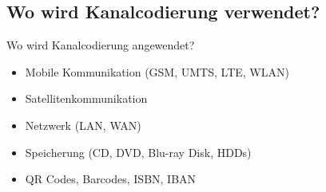 \documentclass[ngerman]{beamer}
\begin{document}
%
%


\subsection{Wo wird Kanalcodierung verwendet?}
\begin{frame}{Wo wird Kanalcodierung angewendet?}
	\begin{itemize}
	\item Mobile Kommunikation (GSM, UMTS, LTE, WLAN)
	\item Satellitenkommunikation
	\item Netzwerk (LAN, WAN)
	\item Speicherung (CD, DVD, Blu-ray Disk, HDDs)
	\item QR Codes, Barcodes, ISBN, IBAN \newline
	\end{itemize}
\end{frame}

\end{document}
